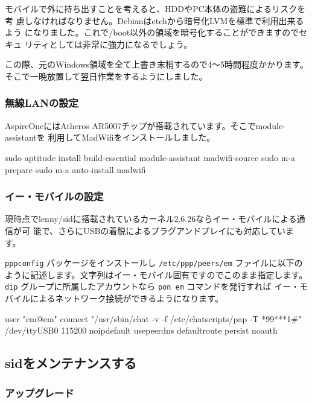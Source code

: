 \documentclass[mingoth,a4paper]{jsarticle}
\begin{document}
モバイルで外に持ち出すことを考えると、HDDやPC本体の盗難によるリスクを考
慮しなければなりません。Debianはetchから暗号化LVMを標準で利用出来るよう
になりました。これで/boot以外の領域を暗号化することができますのでセキュ
リティとしては非常に強力になるでしょう。

この際、元のWindows領域を全て上書き末梢するので4〜5時間程度かかります。
そこで一晩放置して翌日作業をするようにしました。

\subsubsection{無線LANの設定}

AspireOneにはAtheros AR5007チップが搭載されています。そこでmodule-assistantを
利用してMadWifiをインストールしました。

\begin{commandline}
sudo aptitude install build-essential module-assistant madwifi-source
sudo m-a prepare
sudo m-a auto-install madwifi
\end{commandline}

\subsubsection{イー・モバイルの設定}

現時点でlenny/sidに搭載されているカーネル2.6.26ならイー・モバイルによる通信が可
能で、さらにUSBの着脱によるプラグアンドプレイにも対応しています。

\texttt{pppconfig} パッケージをインストールし \texttt{/etc/ppp/peers/em}
ファイルに以下のように記述します。文字列はイー・モバイル固有ですのでこのまま指定します。
\texttt{dip} グループに所属したアカウントなら \texttt{pon em} コマンドを発行すれば
イー・モバイルによるネットワーク接続ができるようになります。

\begin{commandline}
user "em@em"
connect "/usr/sbin/chat -v -f /etc/chatscripts/pap -T *99***1#"
/dev/ttyUSB0
115200
noipdefault
usepeerdns
defaultroute
persist
noauth
\end{commandline}

\subsection{sidをメンテナンスする}

\subsubsection{アップグレード}
\end{document}
